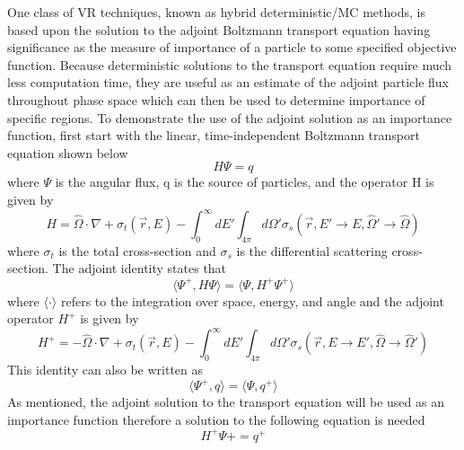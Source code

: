 One class of VR techniques, known as hybrid deterministic/MC methods,
is based upon the solution to the adjoint Boltzmann transport equation having
significance as the measure of importance of a particle to some specified
objective function.  
Because deterministic solutions to the transport equation %
require much less computation time, they are useful as an estimate of the
adjoint
particle flux throughout phase space which can then be used to determine
importance of specific regions.
To demonstrate the use of the adjoint solution as an importance function,
first start with the linear, time-independent Boltzmann transport
equation shown below
\begin{equation} \label{eq:3.1a}
  H\Psi = q
\end{equation}
where $\Psi$ is the angular flux, q is the source of particles, and the operator H
is given by
\begin{equation} \label{eq:3.1b}
		H = \widehat{\Omega} \cdot \nabla +
		    \sigma_{t}(\overrightarrow{r},E) - 
			\int_{0}^{\infty} dE'
			\int_{4\pi} d\Omega'
			\sigma_{s}( \overrightarrow{r}, E' 
			\rightarrow E, \widehat{\Omega}' 
			\rightarrow \widehat{\Omega} )
\end{equation}
where $\sigma_{t}$ is the total cross-section and $\sigma_{s}$ is the
differential scattering cross-section.
The adjoint identity states that
\begin{equation} \label{eq:3.2}
		\langle \Psi^{+} , H\Psi \rangle =
		\langle \Psi, H^{+}\Psi^{+} \rangle
\end{equation}
where $ \langle \cdot \rangle$ refers to the integration over space,
energy, and angle and the adjoint operator $H^{+}$ is given by
\begin{equation} \label{eq:3.2b}
		H^{+} = -\widehat{\Omega} \cdot \nabla +
		    \sigma_{t}(\overrightarrow{r},E) - 
			\int_{0}^{\infty} dE'
			\int_{4\pi} d\Omega'
			\sigma_{s}( \overrightarrow{r}, E 
			\rightarrow E', \widehat{\Omega} 
			\rightarrow \widehat{\Omega}' )
\end{equation}
This identity can also be written as
\begin{equation} \label{eq:3.2b}
		\langle \Psi^{+} , q \rangle =
		\langle \Psi, q^{+} \rangle
\end{equation}
As mentioned, the adjoint solution to the transport
equation will be used as an importance function therefore a solution to the
following equation is needed
\begin{equation} \label{eq:3.3}
		H^{+}\Psi{+} = q^{+}
\end{equation}
